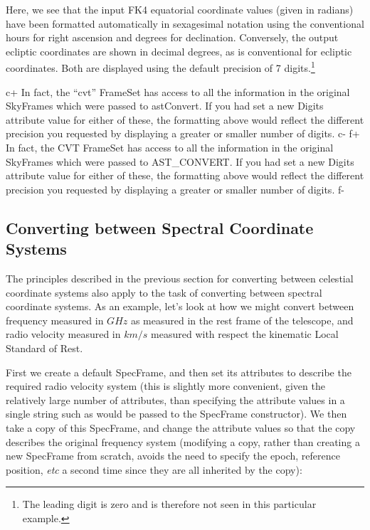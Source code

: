 \documentclass[twoside,11pt]{article}
\begin{document}
Here, we see that the input FK4 equatorial coordinate values (given in
radians) have been formatted automatically in sexagesimal notation
using the conventional hours for right ascension and degrees for
declination. Conversely, the output ecliptic coordinates are shown in
decimal degrees, as is conventional for ecliptic coordinates. Both are
displayed using the default precision of 7 digits.\footnote{The
leading digit is zero and is therefore not seen in this particular
example.}

c+
In fact, the ``cvt'' FrameSet has access to all the information in the
original SkyFrames which were passed to astConvert. If you had set a
new Digits attribute value for either of these, the formatting above
would reflect the different precision you requested by displaying a
greater or smaller number of digits.
c-
f+
In fact, the CVT FrameSet has access to all the information in the
original SkyFrames which were passed to AST\_CONVERT. If you had set a
new Digits attribute value for either of these, the formatting above
would reflect the different precision you requested by displaying a
greater or smaller number of digits.
f-


\subsection{\label{ss:convertingspecframes}Converting between Spectral Coordinate Systems}
The principles described in the previous section for converting between
celestial coordinate systems also apply to the task of converting between
spectral coordinate systems. As an example, let's look at how we might
convert between frequency measured in $GHz$ as measured in the rest frame
of the telescope, and radio velocity measured in $km/s$ measured with
respect the kinematic Local Standard of Rest.

First we create a default SpecFrame, and then set its attributes to
describe the required radio velocity system (this is slightly more
convenient, given the relatively large number of attributes, than
specifying the attribute values in a single string such as would be
passed to the SpecFrame constructor). We then take a copy of this
SpecFrame, and change the attribute values so that the copy describes the
original frequency system (modifying a copy, rather than creating a new
SpecFrame from scratch, avoids the need to specify the epoch, reference
position, \emph{etc} a second time since they are all inherited by the copy):
\end{document}
